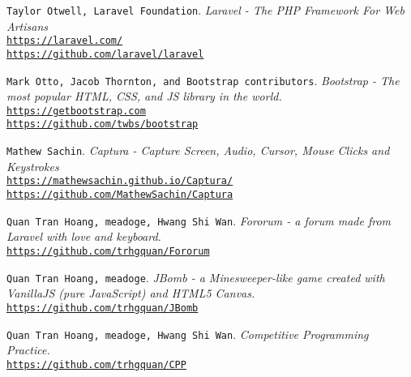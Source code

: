\documentclass{article}
\begin{document}
    \begin{thebibliography}{5}
        \texttt{Taylor Otwell, Laravel Foundation}.
        \textit{Laravel - The PHP Framework For Web Artisans}\\
        \texttt{\url{https://laravel.com/}}\\
        \texttt{\url{https://github.com/laravel/laravel}}


        \texttt{Mark Otto, Jacob Thornton, and Bootstrap contributors}.
        \textit{Bootstrap - The most popular HTML, CSS, and JS library in the world.}\\
        \texttt{\href{https://getbootstrap.com}{https://getbootstrap.com}}\\
        \texttt{\href{https://github.com/twbs/bootstrap}{https://github.com/twbs/bootstrap}}

        \texttt{Mathew Sachin}.
        \textit{Captura - Capture Screen, Audio, Cursor, Mouse Clicks and Keystrokes}\\
        \texttt{\url{https://mathewsachin.github.io/Captura/}}\\
        \texttt{\url{https://github.com/MathewSachin/Captura}}

        \texttt{Quan Tran Hoang, meadoge, Hwang Shi Wan}.
        \textit{Fororum - a forum made from Laravel with love and keyboard.}\\
        \texttt{\url{https://github.com/trhgquan/Fororum}}

        \texttt{Quan Tran Hoang, meadoge}.
        \textit{JBomb - a Minesweeper-like game created with VanillaJS (pure JavaScript) and HTML5 Canvas.}\\
        \texttt{\url{https://github.com/trhgquan/JBomb}}

        \texttt{Quan Tran Hoang, meadoge, Hwang Shi Wan}.
        \textit{Competitive Programming Practice.}\\
        \texttt{\url{https://github.com/trhgquan/CPP}}
    \end{thebibliography}
\end{document}
